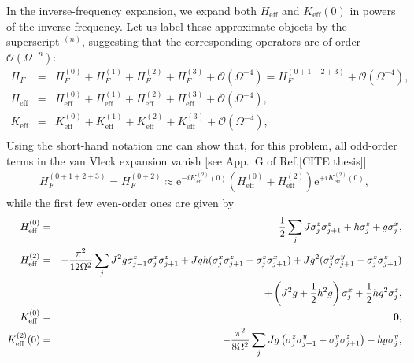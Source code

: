 \documentclass{SciPost}
\newcommand\0{\scalebox{-1}[1]{0}}
\begin{document}
In the inverse-frequency expansion, we expand both $H_\mathrm{eff}$ and $K_\mathrm{eff}(0)$ in powers of the inverse frequency. Let us label these approximate objects by the superscript $^{(n)}$, suggesting that the corresponding operators are of order $\mathcal{O}(\Omega^{-n})$:
\begin{eqnarray*}
H_F &=& H_F^{(0)} + H_F^{(1)} + H_F^{(2)} + H_F^{(3)} + \mathcal{O}(\Omega^{-4}) = H_F^{(0+1+2+3)} + \mathcal{O}(\Omega^{-4}), \nonumber\\ 
H_\mathrm{eff} &=& H_\mathrm{eff}^{(0)} + H_\mathrm{eff}^{(1)} + H_\mathrm{eff}^{(2)} + H_\mathrm{eff}^{(3)} + \mathcal{O}(\Omega^{-4}), \nonumber\\ 
K_\mathrm{eff} &=& K_\mathrm{eff}^{(0)} + K_\mathrm{eff}^{(1)} + K_\mathrm{eff}^{(2)} + K_\mathrm{eff}^{(3)} + \mathcal{O}(\Omega^{-4}), \nonumber\\ 
\end{eqnarray*}
Using the short-hand notation one can show that, for this problem, all odd-order terms in the van Vleck expansion vanish [see App.~G of Ref.[CITE thesis]]
\begin{eqnarray}
H_F^{(0+1+2+3)} = H_F^{(0+2)}\approx \mathrm e^{-iK_\mathrm{eff}^{(2)}(0)}\left( H_\mathrm{eff}^{(0)} + H_\mathrm{eff}^{(2)} \right)\mathrm e^{+iK_\mathrm{eff}^{(2)}(0)}, 
\end{eqnarray}
while the first few even-order ones are given by
\begin{eqnarray}
\label{eq:vV_corrs}
H_\mathrm{eff}^{(0)} &=& \frac{1}{2}\sum_j J\sigma^z_j\sigma^z_{j+1} + h\sigma^z_j + g\sigma^x_j,\nonumber\\
H_\mathrm{eff}^{(2)} &=& -\frac{\pi^2}{12\Omega^2}\sum_j J^2g\sigma^z_{j-1}\sigma^x_j\sigma^z_{j+1} + Jgh(\sigma^x_j\sigma^z_{j+1} + \sigma^z_j\sigma^x_{j+1}) + Jg^2(\sigma^y_j\sigma^y_{j+1}-\sigma^z_j\sigma^z_{j+1}) \nonumber\\
&& \quad \qquad\qquad + \left(J^2g + \frac{1}{2}h^2g\right)\sigma^x_j + \frac{1}{2}hg^2\sigma^z_j,\nonumber\\
K_\mathrm{eff}^{(0)} &=& {\bf 0},\nonumber\\
K_\mathrm{eff}^{(2)}(0) &=& -\frac{\pi^2}{8\Omega^2}\sum_j Jg\left(\sigma^z_j\sigma^y_{j+1} + \sigma^y_j\sigma^z_{j+1}\right) +hg\sigma^y_j,
\end{eqnarray}
\end{document}
